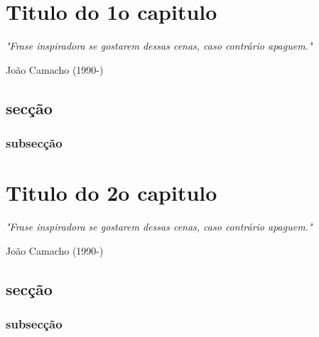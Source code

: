 \documentclass[12pt,a4paper]{ThesisClass}
\begin{document}
\FloatBarrier
\newpage
\chapter{Titulo do 1o capitulo}\label{ch:01cap1}
\begin{center}
\begin{minipage}{15cm}
\textit{"Frase inspiradora se gostarem dessas cenas, caso contrário apaguem."}

\hfill João Camacho (1990-)\\
\end{minipage}
\end{center}

\section{secção}

\subsection{subsecção}


\FloatBarrier
\newpage
\chapter{Titulo do 2o capitulo}\label{ch:02cap2}
\begin{center}
\begin{minipage}{15cm}
\textit{"Frase inspiradora se gostarem dessas cenas, caso contrário apaguem."}

\hfill João Camacho (1990-)\\
\end{minipage}
\end{center}

\section{secção}

\subsection{subsecção}
\end{document}
